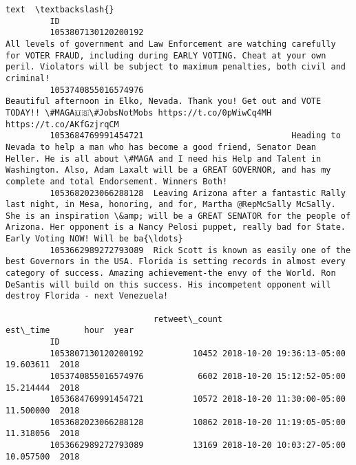 \documentclass[11pt]{article}
\begin{document}
\begin{Verbatim}[commandchars=\\\{\}]
                                                                                                                                                                                                                                                                                                                 text  \textbackslash{}
         ID                                                                                                                                                                                                                                                                                                             
         1053807130120200192                                                                    All levels of government and Law Enforcement are watching carefully for VOTER FRAUD, including during EARLY VOTING. Cheat at your own peril. Violators will be subject to maximum penalties, both civil and criminal!   
         1053740855016574976                                                                                                                                             Beautiful afternoon in Elko, Nevada. Thank you! Get out and VOTE TODAY!! \#MAGA🇺🇸\#JobsNotMobs https://t.co/0pWiwCq4MH https://t.co/AKfGzjrqCM   
         1053684769991454721                              Heading to Nevada to help a man who has become a good friend, Senator Dean Heller. He is all about \#MAGA and I need his Help and Talent in Washington. Also, Adam Laxalt will be a GREAT GOVERNOR, and has my complete and total Endorsement. Winners Both!   
         1053682023066288128  Leaving Arizona after a fantastic Rally last night, in Mesa, honoring, and for, Martha @RepMcSally McSally. She is an inspiration \&amp; will be a GREAT SENATOR for the people of Arizona. Her opponent is a Nancy Pelosi puppet, really bad for State. Early Voting NOW! Will be ba{\ldots}   
         1053662989272793089  Rick Scott is known as easily one of the best Governors in the USA. Florida is setting records in almost every category of success. Amazing achievement-the envy of the World. Ron DeSantis will build on this success. His incompetent opponent will destroy Florida - next Venezuela!   
         
                              retweet\_count                  est\_time       hour  year  
         ID                                                                             
         1053807130120200192          10452 2018-10-20 19:36:13-05:00  19.603611  2018  
         1053740855016574976           6602 2018-10-20 15:12:52-05:00  15.214444  2018  
         1053684769991454721          10572 2018-10-20 11:30:00-05:00  11.500000  2018  
         1053682023066288128          10862 2018-10-20 11:19:05-05:00  11.318056  2018  
         1053662989272793089          13169 2018-10-20 10:03:27-05:00  10.057500  2018  
\end{Verbatim}
            
\end{document}
